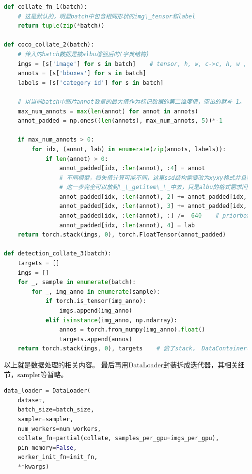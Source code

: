 \documentclass[UTF8]{ctexart}
\begin{document}
\lstset{style=mystyle}
\begin{lstlisting}[language=Python]
def collate_fn_1(batch):
	# 这是默认的，明显batch中包含相同形状的img\_tensor和label
	return tuple(zip(*batch))
	
def coco_collate_2(batch):
	# 传入的batch数据是被albu增强后的(字典结构)
    imgs = [s['image'] for s in batch]    # tensor, h, w, c->c, h, w , handle at transform in __getitem__
    annots = [s['bboxes'] for s in batch]
    labels = [s['category_id'] for s in batch]

	# 以当前batch中图片annot数量的最大值作为标记数据的第二维度值，空出的就补-1。
    max_num_annots = max(len(annot) for annot in annots)
    annot_padded = np.ones((len(annots), max_num_annots, 5))*-1

    if max_num_annots > 0:
        for idx, (annot, lab) in enumerate(zip(annots, labels)):
            if len(annot) > 0:
                annot_padded[idx, :len(annot), :4] = annot
				# 不同模型，损失值计算可能不同，这里ssd结构需要改为xyxy格式并且要做尺度归一化
				# 这一步完全可以放到\_\_getitem\_\_中去，只是albu的格式需求问题。
                annot_padded[idx, :len(annot), 2] += annot_padded[idx, :len(annot), 0]    #  xywh-->x1,y1,x2,y2 for general box,ssd target assigner
                annot_padded[idx, :len(annot), 3] += annot_padded[idx, :len(annot), 1]    # contains padded -1 label
                annot_padded[idx, :len(annot), :] /=  640    # priorbox for ssd primary target assinger
                annot_padded[idx, :len(annot), 4] = lab
	return torch.stack(imgs, 0), torch.FloatTensor(annot_padded)
	
def detection_collate_3(batch):
    targets = []
    imgs = []
    for _, sample in enumerate(batch):
        for _, img_anno in enumerate(sample):
            if torch.is_tensor(img_anno):
                imgs.append(img_anno)
            elif isinstance(img_anno, np.ndarray):
                annos = torch.from_numpy(img_anno).float()
                targets.append(annos)
    return torch.stack(imgs, 0), targets    # 做了stack， DataContainer可以不做stack
\end{lstlisting}

以上就是数据处理的相关内容。
最后再用DataLoader封装拆成迭代器，其相关细节，sampler等暂略。
\lstset{style=mystyle}
\begin{lstlisting}[language=Python]
data_loader = DataLoader(
	dataset,
	batch_size=batch_size,
	sampler=sampler,
	num_workers=num_workers,
	collate_fn=partial(collate, samples_per_gpu=imgs_per_gpu),
	pin_memory=False,
	worker_init_fn=init_fn,
	**kwargs)
\end{lstlisting}
\end{document}

